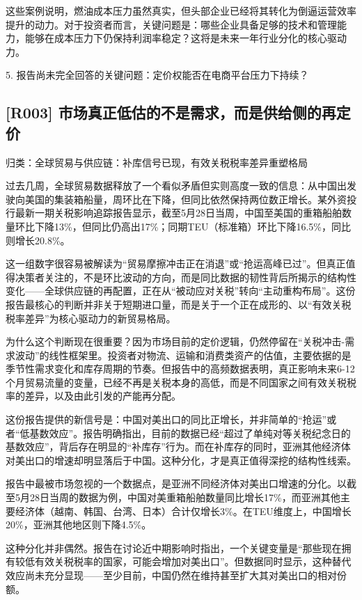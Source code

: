 \documentclass[11pt]{ctexart}
\begin{document}
这些案例说明，燃油成本压力虽然真实，但头部企业已经将其转化为倒逼运营效率提升的动力。对于投资者而言，关键问题是：哪些企业具备足够的技术和管理能力，能够在成本压力下仍保持利润率稳定？这将是未来一年行业分化的核心驱动力。

5. 报告尚未完全回答的关键问题：定价权能否在电商平台压力下持续？

\subsection{[R003] 市场真正低估的不是需求，而是供给侧的再定价}
{\small\color{refgray}归类：全球贸易与供应链：补库信号已现，有效关税税率差异重塑格局}

过去几周，全球贸易数据释放了一个看似矛盾但实则高度一致的信息：从中国出发驶向美国的集装箱船量，周环比在下降，但同比依然保持两位数正增长。某外资投行最新一期关税影响追踪报告显示，截至5月28日当周，中国至美国的重箱船舶数量环比下降13\%，但同比仍高出17\%；同期TEU（标准箱）环比下降16.5\%，同比则增长20.8\%。

这一组数字很容易被解读为“贸易摩擦冲击正在消退”或“抢运高峰已过”。但真正值得决策者关注的，不是环比波动的方向，而是同比数据的韧性背后所揭示的结构性变化——全球供应链的再配置，正在从“被动应对关税”转向“主动重构布局”。这份报告最核心的判断并非关于短期进口量，而是关于一个正在成形的、以“有效关税税率差异”为核心驱动力的新贸易格局。

为什么这个判断现在很重要？因为市场目前的定价逻辑，仍然停留在“关税冲击-需求波动”的线性框架里。投资者对物流、运输和消费类资产的估值，主要依据的是季节性需求变化和库存周期的节奏。但报告中的高频数据表明，真正影响未来6-12个月贸易流量的变量，已经不再是关税本身的高低，而是不同国家之间有效关税税率的差异，以及由此引发的产能再分配。

这份报告提供的新信号是：中国对美出口的同比正增长，并非简单的“抢运”或者“低基数效应”。报告明确指出，目前的数据已经“超过了单纯对等关税纪念日的基数效应”，背后存在明显的“补库存”行为。而在补库存的同时，亚洲其他经济体对美出口的增速却明显落后于中国。这种分化，才是真正值得深挖的结构性线索。

报告中最被市场忽视的一个数据点，是亚洲不同经济体对美出口增速的分化。以截至5月28日当周的数据为例，中国对美重箱船舶数量同比增长17\%，而亚洲其他主要经济体（越南、韩国、台湾、日本）合计仅增长3\%。在TEU维度上，中国增长20\%，亚洲其他地区则下降4.5\%。

这种分化并非偶然。报告在讨论近中期影响时指出，一个关键变量是“那些现在拥有较低有效关税税率的国家，可能会增加对美出口”。但数据同时显示，这种替代效应尚未充分显现——至少目前，中国仍然在维持甚至扩大其对美出口的相对份额。
\end{document}
